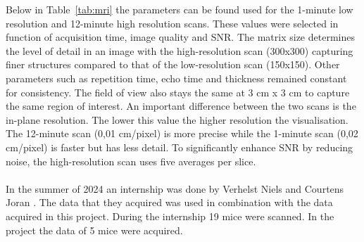 \documentclass[twocolumn]{article}
\begin{document}
Below in Table~\ref{tab:mri} the parameters can be found used for the 1-minute low resolution and 12-minute high resolution scans. These values were selected in function of acquisition time, image quality and SNR. 
The matrix size determines the level of detail in an image with the high-resolution scan (300x300) capturing finer structures compared to that of the low-resolution scan (150x150). Other parameters such as repetition time, echo time and thickness remained constant for consistency. The field of view also stays the same at 3 cm x 3 cm to capture the same region of interest. 
An important difference between the two scans is the in-plane resolution. The lower this value the higher resolution the visualisation. The 12-minute scan (0,01 cm/pixel) is more precise while the 1-minute scan (0,02 cm/pixel) is faster but has less detail. 
To significantly enhance SNR by reducing noise, the high-resolution scan uses five averages per slice.\\
\\
In the summer of 2024 an internship was done by Verhelst Niels and Courtens Joran \cite{verhelst2025denoising}. The data that they acquired was used in combination with the data acquired in this project. During the internship 19 mice were scanned. In the project the data of 5 mice were acquired.
 

\begin{table}[h]
\centering
{}
\caption{\label{tab:mri} Overview of the scan and image parameters used to acquire high- and low-resolution data of mice.}
\end{table}
\end{document}
